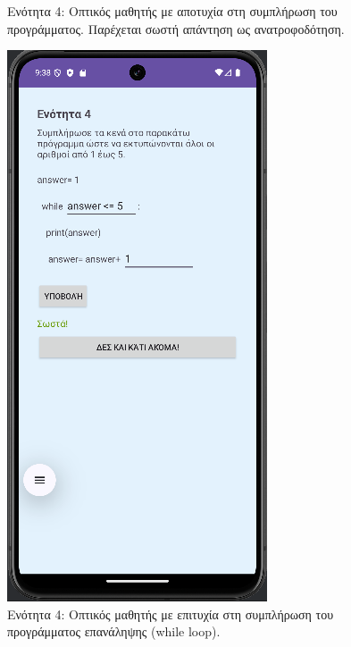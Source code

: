 \documentclass[11pt]{report}
\begin{document}
\begin{figure}[H]
\begin{minipage}[b]{0.45\textwidth}
    \caption{Ενότητα 4: Οπτικός μαθητής με αποτυχία στη συμπλήρωση του προγράμματος. Παρέχεται σωστή απάντηση ως ανατροφοδότηση.}
  \end{minipage}
  \hfill
  \begin{minipage}[b]{0.45\textwidth}
    \includegraphics[width=\linewidth, height=0.35\textheight, keepaspectratio]{Figures/εικόνα (10).png}
    \caption{Ενότητα 4: Οπτικός μαθητής με επιτυχία στη συμπλήρωση του προγράμματος επανάληψης (while loop).}
  \end{minipage}
\end{figure}
\end{document}
